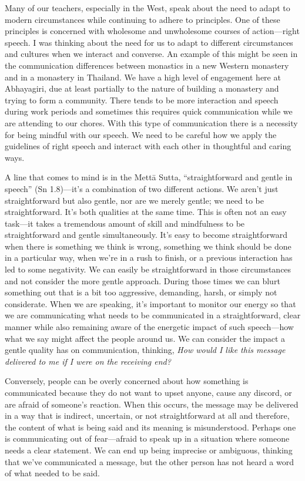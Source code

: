 Many of our teachers, especially in the West, speak about the need to 
adapt to modern circumstances while continuing to adhere to principles. 
One of these principles is concerned with wholesome and unwholesome 
courses of action---right speech. I was thinking about the need for us 
to adapt to different circumstances and cultures when we interact and 
converse. An example of this might be seen in the communication 
differences between monastics in a new Western monastery and in a 
monastery in Thailand. We have a high level of engagement here at 
Abhayagiri, due at least partially to the nature of building a 
monastery and trying to form a community. There tends to be more 
interaction and speech during work periods and sometimes this requires 
quick communication while we are attending to our chores. With this 
type of communication there is a necessity for being mindful with our 
speech. We need to be careful how we apply the guidelines of right 
speech and interact with each other in thoughtful and caring ways.

A line that comes to mind is in the Mettā Sutta, ``straightforward and 
gentle in speech'' (Sn 1.8)---it's a combination of two different 
actions. We aren't just straightforward but also gentle, nor are we 
merely gentle; we need to be straightforward. It's both qualities at 
the same time. This is often not an easy task---it takes a tremendous 
amount of skill and mindfulness to be straightforward and gentle 
simultaneously. It's easy to become straightforward when there is 
something we think is wrong, something we think should be done in a 
particular way, when we're in a rush to finish, or a previous 
interaction has led to some negativity. We can easily be 
straightforward in those circumstances and not consider the more gentle 
approach. During those times we can blurt something out that is a bit 
too aggressive, demanding, harsh, or simply not considerate. When we 
are speaking, it's important to monitor our energy so that we are 
communicating what needs to be communicated in a straightforward, clear 
manner while also remaining aware of the energetic impact of such 
speech---how what we say might affect the people around us. We can 
consider the impact a gentle quality has on communication, thinking, 
\emph{How would I like this message delivered to me if I were on the 
receiving end?}

Conversely, people can be overly concerned about how something is 
communicated because they do not want to upset anyone, cause any 
discord, or are afraid of someone's reaction. When this occurs, the 
message may be delivered in a way that is indirect, uncertain, or not 
straightforward at all and therefore, the content of what is being said 
and its meaning is misunderstood. Perhaps one is communicating out of 
fear---afraid to speak up in a situation where someone needs a clear 
statement. We can end up being imprecise or ambiguous, thinking that 
we've communicated a message, but the other person has not heard a word 
of what needed to be said.

